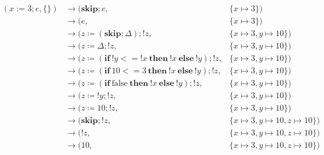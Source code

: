 \[
\begin{aligned}
(x := 3; e, \{\}) &\to (\mathbf{skip}; e, &\{x \mapsto 3\}) \\
&\to (e, &\{x \mapsto 3\}) \\
&\to (z \coloneqq (\mathbf{skip}; \Delta); !z, &\{x \mapsto 3, y \mapsto 10\}) \\
&\to (z \coloneqq \Delta; !z, &\{x \mapsto 3, y \mapsto 10\}) \\
&\to (z \coloneqq (\mathbf{if}\ !y <= !x\ \mathbf{then}\ !x\ \mathbf{else}\ !y); !z, &\{x \mapsto 3, y \mapsto 10\}) \\
&\to (z \coloneqq (\mathbf{if}\ 10 <= 3\ \mathbf{then}\ !x\ \mathbf{else}\ !y); !z, &\{x \mapsto 3, y \mapsto 10\}) \\
&\to (z \coloneqq (\mathbf{if}\ \text{false}\ \mathbf{then}\ !x\ \mathbf{else}\ !y); !z, &\{x \mapsto 3, y \mapsto 10\}) \\
&\to (z \coloneqq !y; !z, &\{x \mapsto 3, y \mapsto 10\}) \\
&\to (z \coloneqq 10; !z, &\{x \mapsto 3, y \mapsto 10\}) \\
&\to (\mathbf{skip}; !z, &\{x \mapsto 3, y \mapsto 10, z \mapsto 10\}) \\
&\to (!z, &\{x \mapsto 3, y \mapsto 10, z \mapsto 10\}) \\
&\to (10, &\{x \mapsto 3, y \mapsto 10, z \mapsto 10\})
\end{aligned}
\]